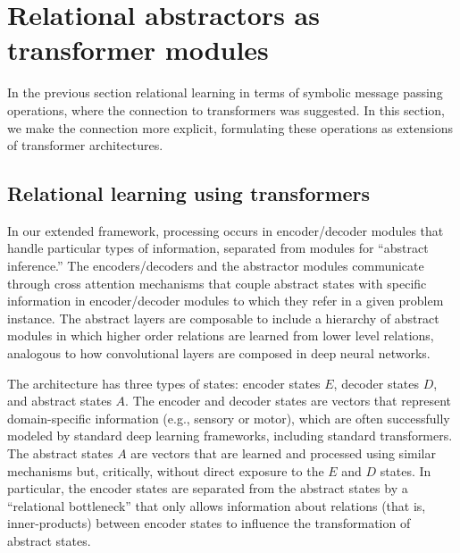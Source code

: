 
\section{Relational abstractors as transformer modules}
\label{sec:abstractors_as_transformer_modules}

In the previous section relational learning 
in terms of symbolic message passing operations, where the connection to transformers 
was suggested. In this section, we make the connection more explicit, formulating 
these operations as extensions of transformer architectures.



\subsection{Relational learning using transformers}

In our extended framework, processing occurs in encoder/decoder modules that handle particular types of information, separated from modules for ``abstract inference.'' The encoders/decoders and the abstractor modules communicate through cross attention mechanisms that couple abstract states with specific information in encoder/decoder modules to which they refer in a given problem instance.  The abstract layers are composable to include a hierarchy of abstract modules in which higher order relations are learned from lower level relations, analogous to how convolutional layers are composed in deep neural networks.

The architecture has three types of states: encoder states $E$, decoder states $D$, and abstract states $A$. The encoder and decoder states are vectors
that represent domain-specific information (e.g., sensory or motor), which are often successfully modeled
by standard deep learning frameworks, including standard transformers. The abstract states $A$ are vectors
that are learned and processed using similar mechanisms but, critically, without direct exposure to the $E$ and $D$ states.  In particular, the encoder states are separated from the abstract states by a ``relational bottleneck''
that only allows information about relations (that is, inner-products) between encoder
states to influence the transformation of abstract states.

